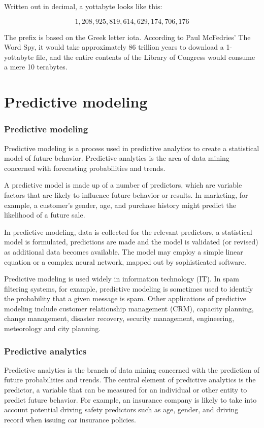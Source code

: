 Written out in decimal, a yottabyte looks like this:

\[ 1,208,925,819,614,629,174,706,176 \]

The prefix is based on the Greek letter iota. According to Paul McFedries' The Word Spy, it would take approximately 86 trillion years to download a 1-yottabyte file, and the entire contents of the Library of Congress would consume a mere 10 terabytes.





\chapter{Predictive modeling}
\subsection{Predictive modeling}
Predictive modeling is a process used in predictive analytics to create a statistical model of future behavior. Predictive analytics is the area of data mining concerned with forecasting probabilities and trends.

A predictive model is made up of a number of predictors, which are variable factors that are likely to influence future behavior or results. In marketing, for example, a customer's gender, age, and purchase history might predict the likelihood of a future sale.

In predictive modeling, data is collected for the relevant predictors, a statistical model is formulated, predictions are made and the model is validated (or revised) as additional data becomes available. The model may employ a simple linear equation or a complex neural network, mapped out by sophisticated software.

Predictive modeling is used widely in information technology (IT). In spam filtering systems, for example, predictive modeling is sometimes used to identify the probability that a given message is spam. Other applications of predictive modeling include customer relationship management (CRM), capacity planning, change management, disaster recovery, security management, engineering, meteorology and city planning.

\subsection{Predictive analytics}
Predictive analytics is the branch of data mining concerned with the prediction of future probabilities and trends. The central element of predictive analytics is the predictor, a variable that can be measured for an individual or other entity to predict future behavior. For example, an insurance company is likely to take into account potential driving safety predictors such as age, gender, and driving record when issuing car insurance policies.

